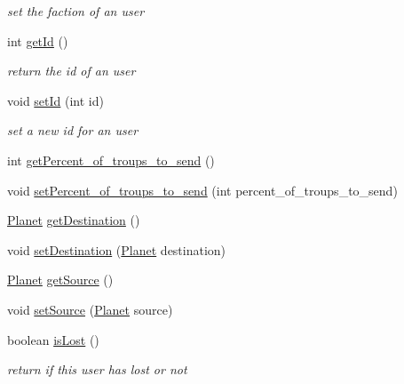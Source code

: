 \begin{DoxyCompactItemize}
\begin{DoxyCompactList}\small\item\em set the faction of an user \end{DoxyCompactList}\item 
int \hyperlink{classfr_1_1groupe40_1_1projet_1_1client_1_1_user_a43318df463de36284d68071ec0a59f34}{get\+Id} ()
\begin{DoxyCompactList}\small\item\em return the id of an user \end{DoxyCompactList}\item 
void \hyperlink{classfr_1_1groupe40_1_1projet_1_1client_1_1_user_a81fb7ded5bdecebd2ddce5d03999f568}{set\+Id} (int id)
\begin{DoxyCompactList}\small\item\em set a new id for an user \end{DoxyCompactList}\item 
int \hyperlink{classfr_1_1groupe40_1_1projet_1_1client_1_1_user_aa1a898620fe07e7b13579cb9f9e7b865}{get\+Percent\+\_\+of\+\_\+troups\+\_\+to\+\_\+send} ()
\item 
void \hyperlink{classfr_1_1groupe40_1_1projet_1_1client_1_1_user_adcf16120e83f73eb8ac0be34fce57b7b}{set\+Percent\+\_\+of\+\_\+troups\+\_\+to\+\_\+send} (int percent\+\_\+of\+\_\+troups\+\_\+to\+\_\+send)
\item 
\hyperlink{classfr_1_1groupe40_1_1projet_1_1model_1_1planets_1_1_planet}{Planet} \hyperlink{classfr_1_1groupe40_1_1projet_1_1client_1_1_user_a1a8f8f74a34b5e4745f23089a223f6d6}{get\+Destination} ()
\item 
void \hyperlink{classfr_1_1groupe40_1_1projet_1_1client_1_1_user_a4b36462569cbce5ac7c47ea1394f9a4c}{set\+Destination} (\hyperlink{classfr_1_1groupe40_1_1projet_1_1model_1_1planets_1_1_planet}{Planet} destination)
\item 
\hyperlink{classfr_1_1groupe40_1_1projet_1_1model_1_1planets_1_1_planet}{Planet} \hyperlink{classfr_1_1groupe40_1_1projet_1_1client_1_1_user_a8d5a9ada62388f690f9dd9d70d4f4d1c}{get\+Source} ()
\item 
void \hyperlink{classfr_1_1groupe40_1_1projet_1_1client_1_1_user_a3da3fb9206c4e00df7700940bd69f601}{set\+Source} (\hyperlink{classfr_1_1groupe40_1_1projet_1_1model_1_1planets_1_1_planet}{Planet} source)
\item 
boolean \hyperlink{classfr_1_1groupe40_1_1projet_1_1client_1_1_user_a0e846e067a87f2cedcc43f25968f000f}{is\+Lost} ()
\begin{DoxyCompactList}\small\item\em return if this user has lost or not \end{DoxyCompactList}\item 

\end{DoxyCompactItemize}
